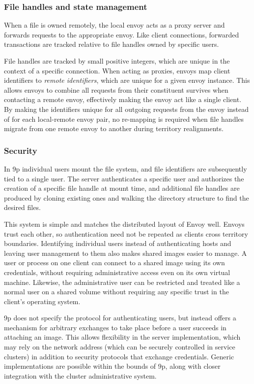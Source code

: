 \subsubsection{File handles and state management}

When a file is owned remotely, the local envoy acts as a proxy server and forwards requests to the appropriate envoy. Like client connections, forwarded transactions are tracked relative to file handles owned by specific users.

File handles are tracked by small positive integers, which are unique in the context of a specific connection. When acting as proxies, envoys map client identifiers to \emph{remote identifiers}, which are unique for a given envoy instance. This allows envoys to combine all requests from their constituent survives when contacting a remote envoy, effectively making the envoy act like a single client. By making the identifiers unique for all outgoing requests from the envoy instead of for each local-remote envoy pair, no re-mapping is required when file handles migrate from one remote envoy to another during territory realignments.

\subsubsection{Security}

In 9p individual users mount the file system, and file identifiers are subsequently tied to a single user. The server authenticates a specific user and authorizes the creation of a specific file handle at mount time, and additional file handles are produced by cloning existing ones and walking the directory structure to find the desired files.

This system is simple and matches the distributed layout of Envoy well. Envoys trust each other, so authentication need not be repeated as clients cross territory boundaries. Identifying individual users instead of authenticating hosts and leaving user management to them also makes shared images easier to manage. A user or process on one client can connect to a shared image using its own credentials, without requiring administrative access even on its own virtual machine. Likewise, the administrative user can be restricted and treated like a normal user on a shared volume without requiring any specific trust in the client's operating system.

9p does not specify the protocol for authenticating users, but instead offers a mechanism for arbitrary exchanges to take place before a user succeeds in attaching an image. This allows flexibility in the server implementation, which may rely on the network address (which can be securely controlled in service clusters) in addition to security protocols that exchange credentials. Generic implementations are possible within the bounds of 9p, along with closer integration with the cluster administrative system.

